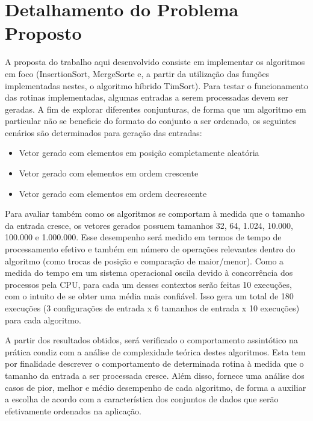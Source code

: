 \chapter{Detalhamento do Problema Proposto}
A proposta do trabalho aqui desenvolvido consiste em implementar os algoritmos em foco (InsertionSort, MergeSorte e, a partir da utilização das funções implementadas nestes, o algoritmo híbrido TimSort). Para testar o funcionamento das rotinas implementadas, algumas entradas a serem processadas devem ser geradas. A fim de explorar diferentes conjunturas, de forma que um algoritmo em particular não se beneficie do formato do conjunto a ser ordenado, os seguintes cenários são determinados para geração das entradas:

\begin{itemize}
	\item Vetor gerado com elementos em posição completamente aleatória
	\item Vetor gerado com elementos em ordem crescente
	\item Vetor gerado com elementos em ordem decrescente
\end{itemize}

Para avaliar também como os algoritmos se comportam à medida que o tamanho da entrada cresce, os vetores gerados possuem tamanhos 32, 64, 1.024, 10.000, 100.000 e 1.000.000. Esse desempenho será medido em termos de tempo de processamento efetivo e também em número de operações relevantes dentro do algoritmo (como trocas de posição e comparação de maior/menor). Como a medida do tempo em um sistema operacional oscila devido à concorrência dos processos pela CPU, para cada um desses contextos serão feitas 10 execuções, com o intuito de se obter uma média mais confiável. Isso gera um total de 180 execuções (3 configurações de entrada x 6 tamanhos de entrada x 10 execuções) para cada algoritmo. 

A partir dos resultados obtidos, será verificado o comportamento assintótico na prática condiz com a análise de complexidade teórica destes algoritmos. Esta tem por finalidade descrever o comportamento de determinada rotina à medida que o tamanho da entrada a ser processada cresce. Além disso, fornece uma análise dos casos de pior, melhor e médio desempenho de cada algoritmo, de forma a auxiliar a escolha de acordo com a característica dos conjuntos de dados que serão efetivamente ordenados na aplicação.
